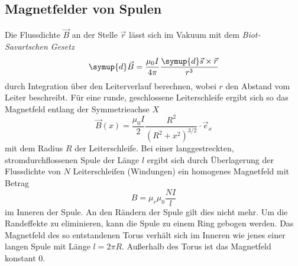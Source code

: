 \subsection{Magnetfelder von Spulen}
\label{subsec:Spulen}
Die Flussdichte $\vec{B}$ an der Stelle $\vec{r}$ lässt sich im Vakuum mit dem \textit{Biot-Savartschen Gesetz}
\begin{equation}
    \label{eqn:BiotSavart}
    \symup{d} \vec{B} = \frac{\mu_0 I}{4 \pi}\frac{\symup{d}\vec{s} \times \vec{r}}{r^3}
\end{equation}
durch Integration über den Leiterverlauf berechnen, wobei $r$ den Abstand vom Leiter beschreibt. Für eine runde, geschlossene Leiterschleife ergibt sich so das Magnetfeld
entlang der Symmetrieachse $X$
\begin{equation*}
    \vec{B}(x) = \frac{\mu_0 I}{2} \frac{R^2}{(R^2+x^2)^{3/2}} \cdot {\vec{e}_x}
\end{equation*}
mit dem Radius $R$ der Leiterschleife.
Bei einer langgestreckten, stromdurchflossenen Spule der Länge $l$ ergibt sich durch Überlagerung der Flussdichte von $N$ Leiterschleifen (Windungen) ein homogenes Magnetfeld mit 
Betrag
\begin{equation}
    \label{eqn:LangeSpule}
    B = \mu_r \mu_0 \frac{N I}{l}
\end{equation}
im Inneren der Spule. An den Rändern der Spule gilt dies nicht mehr. 
Um die Randeffekte zu eliminieren, kann die Spule zu einem Ring gebogen werden. Das Magnetfeld des so entstandenen Torus verhält sich im Inneren wie jenes einer langen Spule mit
Länge $l = 2\pi R$. Außerhalb des Torus ist das Magnetfeld konstant 0. 

